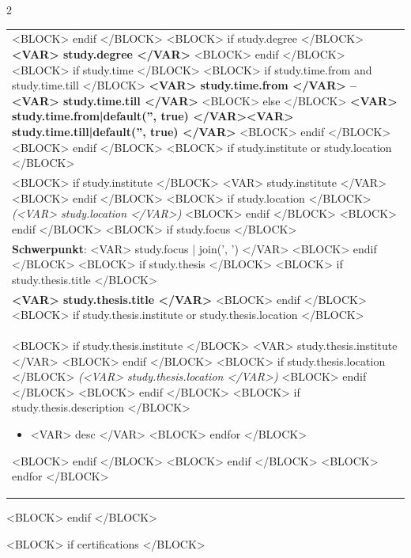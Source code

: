 \documentclass[<VAR> meta.fontsize|default('10pt', true) </VAR>]{extarticle} %
\begin{document}
\begin{paracol}{2}
\begin{tabularx}{\columnwidth}{>{\raggedright\arraybackslash}X}
        \\\\
        \toprule[0.5pt]
        <BLOCK> endif </BLOCK>
        <BLOCK> if study.degree </BLOCK>
        \textbf{<VAR> study.degree </VAR>}
        <BLOCK> endif </BLOCK>
        <BLOCK> if study.time </BLOCK>
        <BLOCK> if study.time.from and study.time.till </BLOCK>
        \hfill \textbf{<VAR> study.time.from </VAR> – <VAR> study.time.till </VAR>}
        <BLOCK> else </BLOCK>
        \hfill \textbf{<VAR> study.time.from|default('', true) </VAR><VAR> study.time.till|default('', true) </VAR>}
        <BLOCK> endif </BLOCK>
        <BLOCK> endif </BLOCK>
        <BLOCK> if study.institute or study.location </BLOCK>
        \\
        <BLOCK> if study.institute </BLOCK>
        <VAR> study.institute </VAR> 
        <BLOCK> endif </BLOCK>
        <BLOCK> if study.location </BLOCK>
        \textit{(<VAR> study.location </VAR>)}
        <BLOCK> endif </BLOCK>
        <BLOCK> endif </BLOCK>
        <BLOCK> if study.focus </BLOCK>
        \\
        \textbf{Schwerpunkt}: 
        <VAR> study.focus | join(', ') </VAR>
        <BLOCK> endif </BLOCK>
        <BLOCK> if study.thesis </BLOCK>
        <BLOCK> if study.thesis.title </BLOCK>
        \\
        \textbf{<VAR> study.thesis.title </VAR>}
        <BLOCK> endif </BLOCK>
        <BLOCK> if study.thesis.institute or study.thesis.location </BLOCK>
        \\
        <BLOCK> if study.thesis.institute </BLOCK>
        <VAR> study.thesis.institute </VAR> 
        <BLOCK> endif </BLOCK>
        <BLOCK> if study.thesis.location </BLOCK>
        \textit{(<VAR> study.thesis.location </VAR>)}
        <BLOCK> endif </BLOCK>
        <BLOCK> endif </BLOCK>
        <BLOCK> if study.thesis.description </BLOCK>
        \begin{itemize}
        <BLOCK> for desc in study.thesis.description </BLOCK>
            \item <VAR> desc </VAR>
        <BLOCK> endfor </BLOCK>
        \end{itemize}
        <BLOCK> endif </BLOCK>
        <BLOCK> endif </BLOCK>
    <BLOCK> endfor </BLOCK>

\end{tabularx}
<BLOCK> endif </BLOCK>

<BLOCK> if certifications </BLOCK>
\medskip
\begin{tabularx}{\columnwidth}{>{\raggedright\arraybackslash}X}


\end{tabularx}
\end{paracol}
\end{document}
